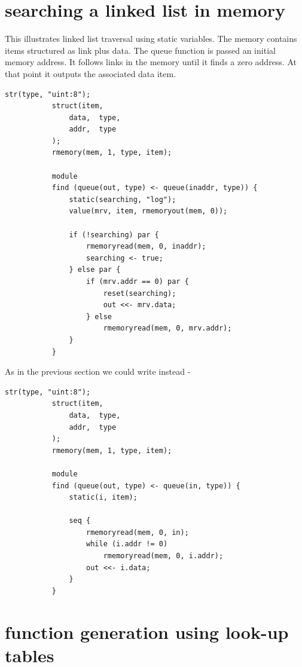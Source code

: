     \section{searching a linked list in memory}\label{sec:link}

        This illustrates linked list traversal using static
        variables. The memory contains items structured as link
        plus data. The queue function is passed an initial
        memory address. It follows links in the memory until it
        finds a zero address. At that point it outputs the
        associated data item.
        \begin{lstlisting}[gobble=8, language=threepl]
           str(type, "uint:8");
           struct(item,
               data,  type,
               addr,  type
           );
           rmemory(mem, 1, type, item);
           
           module
           find (queue(out, type) <- queue(inaddr, type)) {
               static(searching, "log");
               value(mrv, item, rmemoryout(mem, 0));

               if (!searching) par {
                   rmemoryread(mem, 0, inaddr);
                   searching <- true;
               } else par {
                   if (mrv.addr == 0) par {
                       reset(searching);
                       out <<- mrv.data;
                   } else
                       rmemoryread(mem, 0, mrv.addr);
               }
           }
        \end{lstlisting}

        As in the previous section we could write instead -
        \begin{lstlisting}[gobble=8, language=threepl]
           str(type, "uint:8");
           struct(item,
               data,  type,
               addr,  type
           );
           rmemory(mem, 1, type, item);

           module
           find (queue(out, type) <- queue(in, type)) {
               static(i, item);

               seq {
                   rmemoryread(mem, 0, in);
                   while (i.addr != 0)
                       rmemoryread(mem, 0, i.addr);
                   out <<- i.data;
               }
           }
        \end{lstlisting}



    \section{function generation using look-up tables}\label{sec:fglut}

